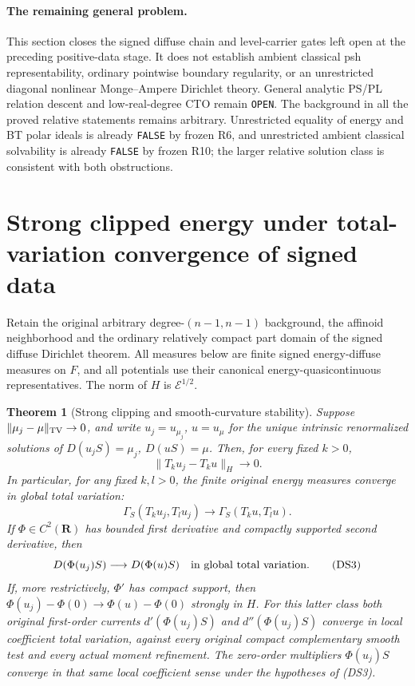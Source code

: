 \documentclass[11pt,a4paper]{article}
\numberwithin{equation}{section}
\newtheorem{theorem}{Theorem}[section]
\theoremstyle{definition}
\theoremstyle{remark}
\begin{document}
\paragraph{The remaining general problem.}
This section closes the signed diffuse chain and level-carrier
gates left open at the preceding positive-data stage.  It does
not establish ambient classical psh representability, ordinary
pointwise boundary regularity, or an unrestricted diagonal nonlinear Monge--Ampere
Dirichlet theory.  General analytic PS/PL relation descent and
low-real-degree CTO remain \texttt{OPEN}.  The background in
all the proved relative statements remains arbitrary.
Unrestricted equality of energy and BT polar ideals is already
\texttt{FALSE} by frozen R6, and unrestricted ambient classical
solvability is already \texttt{FALSE} by frozen R10; the larger
relative solution class is consistent with both obstructions.



\section{Strong clipped energy under total-variation convergence of signed data}
\label{sec:r11-signed-data-strong-clipping}

Retain the original arbitrary degree-$(n-1,n-1)$ background,
the affinoid neighborhood and the ordinary relatively compact
part domain of the signed diffuse Dirichlet theorem.  All
measures below are finite signed energy-diffuse measures on
$F$, and all potentials use their canonical energy-quasicontinuous
representatives.  The norm of $H$ is $\mathcal E^{1/2}$.

\begin{theorem}[Strong clipping and smooth-curvature stability]
\label{thm:r11-signed-data-strong-clipping}
Suppose $\|\mu_j-\mu\|_{\rm TV}\to0$, and write
$u_j=u_{\mu_j}$, $u=u_\mu$ for the unique intrinsic
renormalized solutions of $D(u_jS)=\mu_j$, $D(uS)=\mu$.
Then, for every fixed $k>0$,
\[
                    \|T_ku_j-T_ku\|_H\longrightarrow0.
 \tag{DS1}
\]
In particular, for any fixed $k,l>0$, the finite original
energy measures converge in global total variation:
\[
 \Gamma_S(T_ku_j,T_lu_j)
               \longrightarrow\Gamma_S(T_ku,T_lu).
 \tag{DS2}
\]
If $\Phi\in C^2(\mathbf R)$ has bounded first derivative
and compactly supported second derivative, then
\[
           D(\Phi(u_j)S)\longrightarrow D(\Phi(u)S)
                       \quad\hbox{in global total variation}.
 \tag{DS3}
\]
If, more restrictively, $\Phi'$ has compact support, then
$\Phi(u_j)-\Phi(0)\to\Phi(u)-\Phi(0)$ strongly in $H$.
For this latter class both original first-order currents
$d'(\Phi(u_j)S)$ and $d''(\Phi(u_j)S)$ converge in local
coefficient total variation, against every original compact
complementary smooth test and every actual moment refinement.
The zero-order multipliers $\Phi(u_j)S$ converge in that same
local coefficient sense under the hypotheses of (DS3).
\end{theorem}
\end{document}
